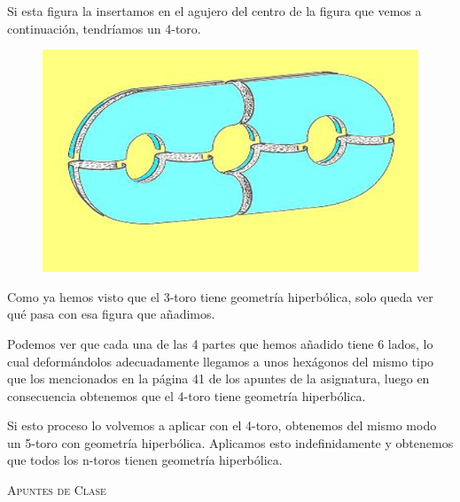 \begin{enumerate}
Si esta figura la insertamos en el agujero del centro de la figura que vemos a continuación, tendríamos un 4-toro.

\begin{figure}[H]
\centering
\includegraphics[scale=0.35]{images/geometria_universo/fig_pag_41.png}
\end{figure}


Como ya hemos visto que el 3-toro tiene geometría hiperbólica, solo queda ver qué pasa con esa figura que añadimos.

Podemos ver que cada una de las 4 partes que hemos añadido tiene 6 lados, lo cual deformándolos adecuadamente llegamos a unos hexágonos del mismo tipo que los mencionados en la página 41 de los apuntes de la asignatura, luego en consecuencia obtenemos que el 4-toro tiene geometría hiperbólica.

Si esto proceso lo volvemos a aplicar con el 4-toro, obtenemos del mismo modo un 5-toro con geometría hiperbólica. Aplicamos esto indefinidamente y obtenemos que todos los n-toros tienen geometría hiperbólica.

\end{enumerate}




\newpage
\begin{thebibliography}{X}

 \textsc{Apuntes de Clase}

\end{thebibliography}




